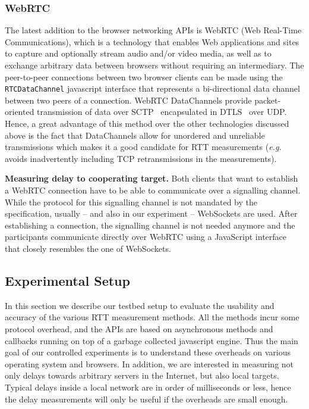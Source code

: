 \documentclass{sig-alternate-10pt}
\begin{document}
\subsubsection{WebRTC}
\label{subsubsec:webrtc}

The latest addition to the browser networking APIs is WebRTC (Web Real-Time Communications), which is a technology that enables Web applications and sites to capture and optionally stream audio and/or video media, as well as to exchange arbitrary data between browsers without requiring an intermediary. The peer-to-peer connections between two browser clients can be made using the \texttt{RTCDataChannel} javascript interface that represents a bi-directional data channel between two peers of a connection. WebRTC DataChannels provide packet-oriented transmission of data over SCTP~\cite{ieee_rfc4960:_????} encapsulated in DTLS~\cite{ieee_rfc4347:_????} over UDP. Hence, a great advantage of this method over the other technologies discussed above is the fact that DataChannels allow for unordered and unreliable transmissions which makes it a good candidate for RTT measurements (\emph{e.g.} avoids inadvertently including TCP retransmissions in the measurements). 

\textbf{Measuring delay to cooperating target.} Both clients that want to establish a WebRTC connection have to be able to communicate over a signalling channel. While the protocol for this signalling channel is not mandated by the specification, usually -- and also in our experiment -- WebSockets are used. After establishing a connection, the signalling channel is not needed anymore and the participants communicate directly over WebRTC using a JavaScript interface that closely resembles the one of WebSockets. 

\subsection{Experimental Setup}
\label{subsec:setup}


In this section we describe our testbed setup to evaluate the usability and accuracy of the various RTT measurement methods. 
All the methods incur some protocol overhead,
and the APIs are based on asynchronous methods and callbacks running on top of a garbage collected javascript engine. Thus the main goal of our controlled experiments is to understand these overheads on various operating system and browsers. In addition, we are interested in measuring not only delays towards arbitrary servers in the Internet, but also local targets.
Typical delays inside a local network are in order of milliseconds or less, hence the delay measurements will only be useful if the  overheads are small enough.
\end{document}
